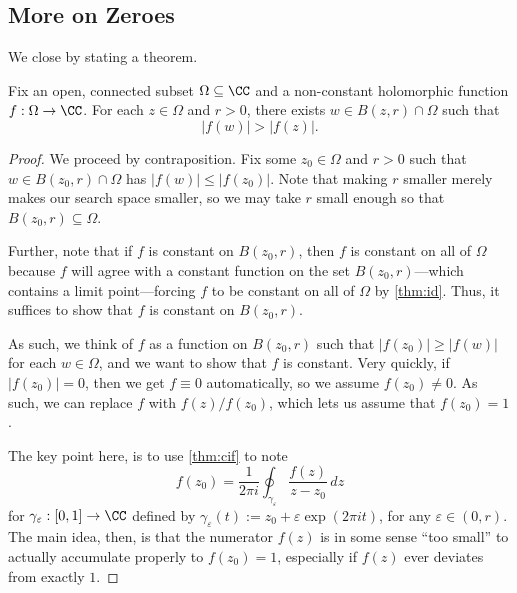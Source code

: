 \subsection{More on Zeroes}
We close by stating a theorem.
\begin{theorem} \label{thm:mmp}
	Fix an open, connected subset $\Omega\subseteq\CC$ and a non-constant holomorphic function $f:\Omega\to\CC$. For each $z\in\Omega$ and $r>0$, there exists $w\in B(z,r)\cap\Omega$ such that
	\[|f(w)|>|f(z)|.\]
\end{theorem}
\begin{proof}
	We proceed by contraposition. Fix some $z_0\in\Omega$ and $r>0$ such that $w\in B(z_0,r)\cap\Omega$ has $|f(w)|\le|f(z_0)|$. Note that making $r$ smaller merely makes our search space smaller, so we may take $r$ small enough so that $B(z_0,r)\subseteq\Omega$.
	
	Further, note that if $f$ is constant on $B(z_0,r)$, then $f$ is constant on all of $\Omega$ because $f$ will agree with a constant function on the set $B(z_0,r)$---which contains a limit point---forcing $f$ to be constant on all of $\Omega$ by \autoref{thm:id}. Thus, it suffices to show that $f$ is constant on $B(z_0,r)$.

	As such, we think of $f$ as a function on $B(z_0,r)$ such that $|f(z_0)|\ge|f(w)|$ for each $w\in\Omega$, and we want to show that $f$ is constant. Very quickly, if $|f(z_0)|=0$, then we get $f\equiv0$ automatically, so we assume $f(z_0)\ne0$. As such, we can replace $f$ with $f(z)/f(z_0)$, which lets us assume that $f(z_0)=1$.
	
	The key point here, is to use \autoref{thm:cif} to note
	\[f(z_0)=\frac1{2\pi i}\oint_{\gamma_\varepsilon}\frac{f(z)}{z-z_0}\,dz\]
	for $\gamma_\varepsilon:[0,1]\to\CC$ defined by $\gamma_\varepsilon(t):=z_0+\varepsilon\exp(2\pi it)$, for any $\varepsilon\in(0,r)$. The main idea, then, is that the numerator $f(z)$ is in some sense ``too small'' to actually accumulate properly to $f(z_0)=1$, especially if $f(z)$ ever deviates from exactly $1$.
	

\end{proof}
